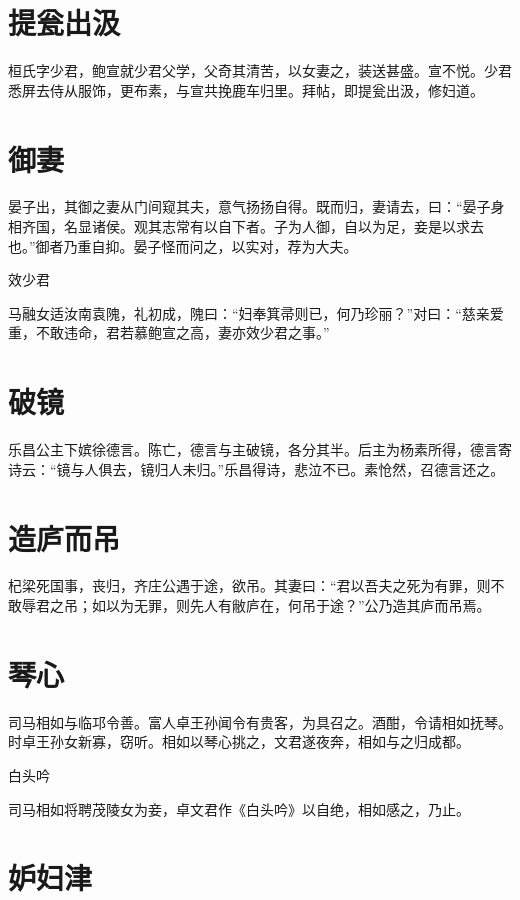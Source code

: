 \documentclass[a4paper,12pt,UTF8,twoside]{ctexbook}
\begin{document}
    \section{提瓮出汲}
    
    桓氏字少君，鲍宣就少君父学，父奇其清苦，以女妻之，装送甚盛。宣不悦。少君悉屏去侍从服饰，更布素，与宣共挽鹿车归里。拜帖，即提瓮出汲，修妇道。
    
    \section{御妻}
    
    晏子出，其御之妻从门间窥其夫，意气扬扬自得。既而归，妻请去，曰：“晏子身相齐国，名显诸侯。观其志常有以自下者。子为人御，自以为足，妾是以求去也。”御者乃重自抑。晏子怪而问之，以实对，荐为大夫。
    
    效少君
    
    马融女适汝南袁隗，礼初成，隗曰：“妇奉箕帚则已，何乃珍丽？”对曰：“慈亲爱重，不敢违命，君若慕鲍宣之高，妻亦效少君之事。”
    
    \section{破镜}
    
    乐昌公主下嫔徐德言。陈亡，德言与主破镜，各分其半。后主为杨素所得，德言寄诗云：“镜与人俱去，镜归人未归。”乐昌得诗，悲泣不已。素怆然，召德言还之。
    
    \section{造庐而吊}
    
    杞梁死国事，丧归，齐庄公遇于途，欲吊。其妻曰：“君以吾夫之死为有罪，则不敢辱君之吊；如以为无罪，则先人有敝庐在，何吊于途？”公乃造其庐而吊焉。
    
    \section{琴心}
    
    司马相如与临邛令善。富人卓王孙闻令有贵客，为具召之。酒酣，令请相如抚琴。时卓王孙女新寡，窃听。相如以琴心挑之，文君遂夜奔，相如与之归成都。
    
    白头吟
    
    司马相如将聘茂陵女为妾，卓文君作《白头吟》以自绝，相如感之，乃止。
    
    \section{妒妇津}
    
\end{document}
